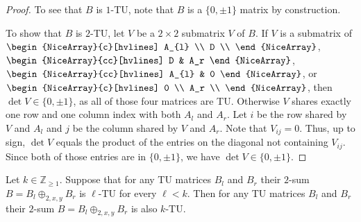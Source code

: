 \begin{proof}
    To see that $B$ is $1$-TU, note that $B$ is a $\{0, \pm 1\}$ matrix by construction.

    To show that $B$ is $2$-TU, let $V$ be a $2 \times 2$ submatrix $V$ of $B$. If $V$ is a submatrix of $\begin{NiceArray}{c}[hvlines] A_{l} \\ D \\ \end{NiceArray}$, $\begin{NiceArray}{cc}[hvlines] D & A_r \end{NiceArray}$, $\begin{NiceArray}{cc}[hvlines] A_{l} & 0 \end{NiceArray}$, or  $\begin{NiceArray}{c}[hvlines] 0 \\ A_r \\ \end{NiceArray}$, then $\det V \in \{0, \pm 1\}$, as all of those four matrices are TU. Otherwise $V$ shares exactly one row and one column index with both $A_{l}$ and $A_{r}$. Let $i$ be the row shared by $V$ and $A_{l}$ and $j$ be the column shared by $V$ and $A_{r}$. Note that $V_{ij} = 0$. Thus, up to sign, $\det V$ equals the product of the entries on the diagonal not containing $V_{ij}$. Since both of those entries are in $\{0, \pm 1\}$, we have $\det V \in \{0, \pm 1\}$.
\end{proof}

\begin{lemma}\label{lem:two_sum_k_tu_induction}
    Let $k \in \mathbb{Z}_{\geq 1}$. Suppose that for any TU matrices $B_{l}$ and $B_{r}$ their $2$-sum $B = B_{l} \oplus_{2, x, y} B_{r}$ is $\ell$-TU for every $\ell < k$. Then for any TU matrices $B_{l}$ and $B_{r}$ their $2$-sum $B = B_{l} \oplus_{2, x, y} B_{r}$ is also $k$-TU.
\end{lemma}

